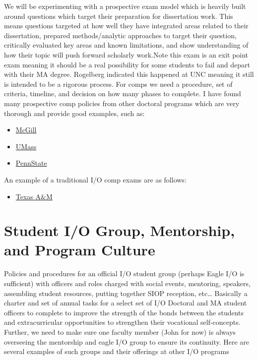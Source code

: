 \documentclass[
]{book}
\providecommand{\tightlist}{%
  \setlength{\itemsep}{0pt}\setlength{\parskip}{0pt}}
\begin{document}
We will be experimenting with a prospective exam model which is heavily built around questions which target their preparation for dissertation work. This means questions targeted at how well they have integrated areas related to their dissertation, prepared methods/analytic approaches to target their question, critically evaluated key areas and known limitations, and show understanding of how their topic will push forward scholarly work.Note this exam is an exit point exam meaning it should be a real possibility for some students to fail and depart with their MA degree. Rogelberg indicated this happened at UNC meaning it still is intended to be a rigorous process. For comps we need a procedure, set of criteria, timeline, and decision on how many phases to complete. I have found many prospective comp policies from other doctoral programs which are very thorough and provide good examples, such as:

\begin{itemize}
\tightlist
\item
  \href{https://www.mcgill.ca/socialwork/prospective/phd/comprehensive-exam}{McGill}
\item
  \href{https://www.umass.edu/communication/node/861}{UMass}
\item
  \href{http://gradschool.psu.edu/graduate-education-policies/gcac/gcac-600/gcac-604-qualifying-exam/}{PennState}
\end{itemize}

An example of a traditional I/O comp exams are as follows:

\begin{itemize}
\tightlist
\item
  \href{https://liberalarts.tamu.edu/wp-content/uploads/sites/2/2018/02/I-O-area-comps-policy-Nov-16th-2015.pdf}{Texas A\&M}
\end{itemize}

\hypertarget{culture}{%
\chapter{Student I/O Group, Mentorship, and Program Culture}\label{culture}}

Policies and procedures for an official I/O student group (perhaps Eagle I/O is sufficient) with officers and roles charged with social events, mentoring, speakers, assembling student resources, putting together SIOP reception, etc\ldots{} Basically a charter and set of annual tasks for a select set of I/O Doctoral and MA student officers to complete to improve the strength of the bonds between the students and extracurricular opportunities to strengthen their vocational self-concepts. Further, we need to make sure one faculty member (John for now) is always overseeing the mentorship and eagle I/O group to ensure its continuity. Here are several examples of such groups and their offerings at other I/O programs
\end{document}
